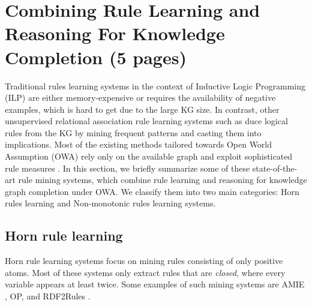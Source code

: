 \section{Combining Rule Learning and Reasoning For Knowledge Completion (5 pages)}
\label{sec:rules_kg_completion}
Traditional rules learning systems in the context of Inductive Logic Programming (ILP) \cite{probfoil,DBLP:conf/ijcai/RaedtDTBV15,DBLP:conf/clima/CorapiSIR11} are either memory-expensive or requires the availability of negative examples, which is hard to get due to the large KG size. In contrast, other unsupervised relational 
association rule learning systems such as \cite{DBLP:conf/clima/CorapiSIR11}duce logical rules from the KG by mining frequent patterns and casting them into implications. Most of the  existing methods tailored towards Open World Assumption (OWA) rely only on the available graph and exploit sophisticated rule measures \cite{amie,op,rumis}.
In this section, we briefly summarize some of these state-of-the-art rule mining systems, which combine rule learning and reasoning for knowledge graph completion under OWA. We classify them into two main categories: Horn rules learning and Non-monotonic rules learning systems.
\subsection{Horn rule learning}
Horn rule learning systems focus on mining rules consisting of only positive atoms. Most of these systems only extract rules that are \emph{closed}, where every variable appears at least twice. Some examples of such mining systems are AMIE \cite{amie}, OP, \cite{op} and RDF2Rules \cite{rdf2rules}.
